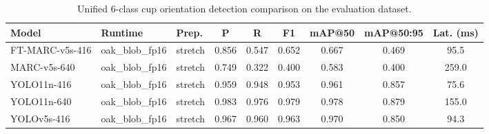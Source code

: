 \begin{table}[t]
  \centering
  \caption{Unified 6-class cup orientation detection comparison on the evaluation dataset.}
  \label{tab:yolo-comparison}
  \begin{tabular}{lllcccccc}
    \toprule
    Model & Runtime & Prep. & P & R & F1 & mAP@50 & mAP@50:95 & Lat. (ms) \\
    \midrule
    FT-MARC-v5s-416 & oak\_blob\_fp16 & stretch & 0.856 & 0.547 & 0.652 & 0.667 & 0.469 & 95.5 \\
    MARC-v5s-640 & oak\_blob\_fp16 & stretch & 0.749 & 0.322 & 0.400 & 0.583 & 0.400 & 259.0 \\
    YOLO11n-416 & oak\_blob\_fp16 & stretch & 0.959 & 0.948 & 0.953 & 0.961 & 0.857 & 75.6 \\
    YOLO11n-640 & oak\_blob\_fp16 & stretch & 0.983 & 0.976 & 0.979 & 0.978 & 0.879 & 155.0 \\
    YOLOv5s-416 & oak\_blob\_fp16 & stretch & 0.967 & 0.960 & 0.963 & 0.970 & 0.850 & 94.3 \\
    \bottomrule
  \end{tabular}
\end{table}
